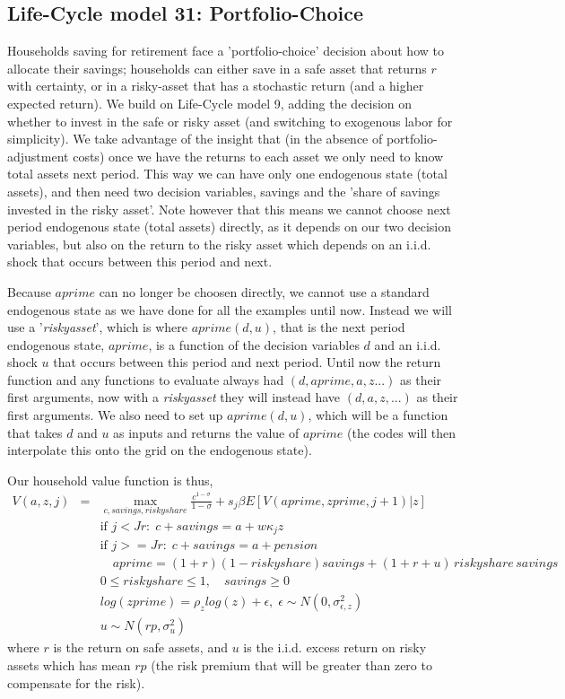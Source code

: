 \subsection{Life-Cycle model 31: Portfolio-Choice}
Households saving for retirement face a 'portfolio-choice' decision about how to allocate their savings; households can either save in a safe asset that returns $r$ with certainty, or in a risky-asset that has a stochastic return (and a higher expected return). We build on Life-Cycle model 9, adding the decision on whether to invest in the safe or risky asset (and switching to exogenous labor for simplicity). We take advantage of the insight that (in the absence of portfolio-adjustment costs) once we have the returns to each asset we only need to know total assets next period. This way we can have only one endogenous state (total assets), and then need two decision variables, savings and the 'share of savings invested in the risky asset'. Note however that this means we cannot choose next period endogenous state (total assets) directly, as it depends on our two decision variables, but also on the return to the risky asset which depends on an i.i.d. shock that occurs between this period and next.

Because $aprime$ can no longer be choosen directly, we cannot use a standard endogenous state as we have done for all the examples until now. Instead we will use a '\textit{riskyasset}', which is where $aprime(d,u)$, that is the next period endogenous state, $aprime$, is a function of the decision variables $d$ and an i.i.d. shock $u$ that occurs between this period and next period. Until now the return function and any functions to evaluate always had $(d,aprime,a,z...)$ as their first arguments, now with a \textit{riskyasset} they will instead have $(d,a,z,...)$ as their first arguments. We also need to set up $aprime(d,u)$, which will be a function that takes $d$ and $u$ as inputs and returns the value of $aprime$ (the codes will then interpolate this onto the grid on the endogenous state).

Our household value function is thus,
\begin{eqnarray*}
 V(a,z,j)&=& \max_{c,savings,riskyshare} \frac{c^{1-\sigma}}{1-\sigma} + s_j \beta E[V(aprime,zprime,j+1)|z] \\
&& \text{if }j<Jr: \; c+savings=a+w \kappa_j z\\
&& \text{if }j>=Jr: \; c+savings= a +pension\\
&& \quad aprime=(1+r) (1-riskyshare) savings + (1+r+u) \, riskyshare \, savings \\
&& 0 \leq riskyshare \leq 1, \quad savings\geq 0 \\
&& log(zprime)=\rho_z log(z) + \epsilon, \; \epsilon \sim N(0,\sigma_{\epsilon,z}^2) \\
&& u \sim N(rp,\sigma_u^2)
\end{eqnarray*}
where $r$ is the return on safe assets, and $u$ is the i.i.d. excess return on risky assets which has mean $rp$ (the risk premium that will be greater than zero to compensate for the risk).

